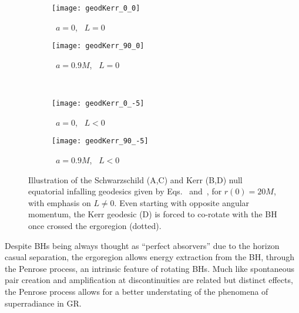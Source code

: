 \begin{figure}[h]
    \centering
    \vspace{0.5cm}
    \begin{subfigure}[c]{0.4\textwidth}
        \texttt{[image: geodKerr\_0\_0]}
        \caption{ ~$a=0$, ~$L=0$}
    \end{subfigure}
    \hspace{1cm}
    \begin{subfigure}[c]{0.4\textwidth}
        \texttt{[image: geodKerr\_90\_0]}
        \caption{~$a=0.9 M$, ~$L=0$}
    \end{subfigure}
    \\
    \vspace{0.3cm}
    \begin{subfigure}[c]{0.4\textwidth}
        \texttt{[image: geodKerr\_0\_-5]}
        \caption{~$a=0$, ~$L<0$}
    \end{subfigure}
    \hspace{1cm}
    \begin{subfigure}[c]{0.4\textwidth}
        \texttt{[image: geodKerr\_90\_-5]}
        \caption{~$a=0.9 M$, ~$L<0$}
    \end{subfigure}
    \caption{Illustration of the Schwarzschild ({\footnotesize\textsc{A,C}}) and Kerr ({\footnotesize\textsc{B,D}}) null equatorial infalling geodesics given by Eqs.~ and~, for $r(0)=20 M$, with emphasis on $L\ne0$. Even starting with opposite angular momentum, the Kerr geodesic ({\footnotesize\textsc{D}}) is forced to co-rotate with the BH once crossed the ergoregion (dotted).}
    \label{fig2:geodesics}
\end{figure}

Despite BHs being always thought as ``perfect absorvers'' due to the horizon casual separation, the ergoregion allows energy extraction from the BH, through the Penrose process, an intrinsic feature of rotating BHs.
Much like spontaneous pair creation and amplification at discontinuities are related but distinct effects, the Penrose process allows for a better understating of the phenomena of superradiance in GR. 

